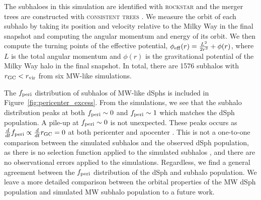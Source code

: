 \documentclass[twocolumn]{aastex63}
\begin{document}
The subhaloes in this simulation are identified with \textsc{rockstar} \citep{Behroozi2013ApJ...762..109B} and the merger trees are constructed with \textsc{consistent trees} \citep{Behroozi2013ApJ...763...18B}. 
We measure the orbit of each subhalo by taking its position and velocity relative to the Milky Way in the final snapshot and computing the angular momentum and energy of its orbit. We then compute the turning points of the effective potential, $\phi_{\rm eff}(r) = \frac{L^2}{2r^2}+\phi(r)$, where $L$ is the total angular momentum and $\phi(r)$ is the gravitational potential of the Milky Way halo in the final snapshot.
In total, there are 1576 subhalos with $r_{\rm GC}<r_{\rm vir}$ from six MW-like simulations. 

The  $f_{\rm peri}$ distribution of subhalos of MW-like dSphs is included in  Figure~\ref{fig:pericenter_excess}.
From the simulations, we see that the subhalo distribution peaks at both $f_{\rm peri}\sim0$ and $f_{\rm peri}\sim1$ which matches the dSph population. 
A pile-up at $f_{\rm peri}\sim 0$ is not unexpected. 
These  peaks occurs as $\frac{d}{dt} f_{\rm peri}\propto \frac{d}{dt} r_{\rm GC} =0$ at both pericenter and apocenter  \citep{Li2022ApJ...928...30L}.
This is not a one-to-one comparison between the simulated subhalos and the observed dSph population, as there is no selection function applied to the simulated subhalos \citep[e.g.][]{DrlicaWagner2020ApJ...893...47D},  and there are no observational errors applied to the simulations.
Regardless, we find a general agreement between the $f_{\rm peri}$ distribution of the  dSph and subhalo population. 
We leave a more detailed comparison between the orbital properties of the MW dSph population and simulated MW subhalo population to a future work. 
\end{document}
